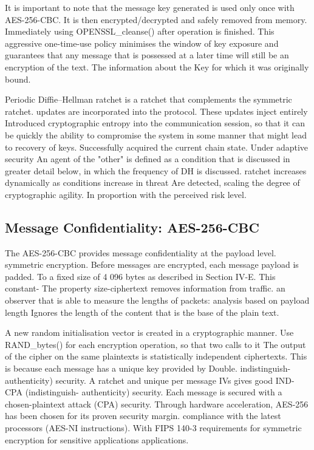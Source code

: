 \documentclass[conference]{IEEEtran}
\begin{document}
It is important to note that the message key generated is used only once with AES-256-CBC.
It is then encrypted/decrypted and safely removed from memory.
Immediately using OPENSSL\_cleanse() after operation is finished.  This
aggressive one-time-use policy minimises the window of key exposure and
guarantees that any message that is possessed at a later time will still be an encryption of the text.
The information about the Key for which it was originally bound.

Periodic Diffie–Hellman ratchet is a ratchet that complements the symmetric ratchet.
updates are incorporated into the protocol.  These updates inject entirely
Introduced cryptographic entropy into the communication session, so that it can be quickly
the ability to compromise the system in some manner that might lead to recovery of keys.
Successfully acquired the current chain state.  Under adaptive security
An agent of the "other" is defined as a condition that is discussed in greater detail below, in which the frequency of DH is discussed.
ratchet increases dynamically as conditions increase in threat
Are detected, scaling the degree of cryptographic agility.
In proportion with the perceived risk level.

\subsection{Message Confidentiality: AES-256-CBC}

The AES-256-CBC provides message confidentiality at the payload level.
symmetric encryption.  Before messages are encrypted, each message payload is padded.
To a fixed size of 4 096 bytes as described in Section IV-E.  This constant-
The property size-ciphertext removes information from traffic.
an observer that is able to measure the lengths of packets: analysis based on payload length
Ignores the length of the content that is the base of the plain text.

A new random initialisation vector is created in a cryptographic manner.
Use RAND\_bytes() for each encryption operation, so that two calls to it
The output of the cipher on the same plaintexts is statistically independent
ciphertexts.  This is because each message has a unique key provided by Double.
indistinguish-authenticity) security. A ratchet and unique per message IVs gives good IND-CPA (indistinguish- authenticity) security.
Each message is secured with a chosen-plaintext attack (CPA) security.
Through hardware acceleration, AES-256 has been chosen for its proven security margin.
compliance with the latest processors (AES-NI instructions).
With FIPS 140-3 requirements for symmetric encryption for sensitive applications
applications.
\end{document}
